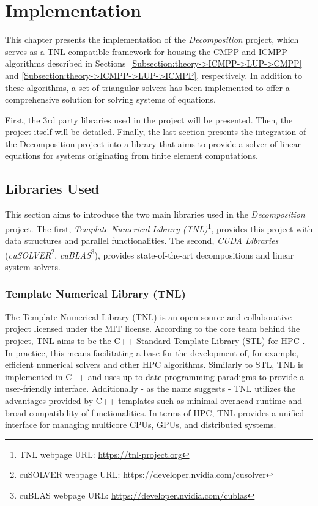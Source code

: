 \chapter{Implementation}\label{Chapter:implementation}
This chapter presents the implementation of the \textit{Decomposition} project, which serves as a TNL-compatible framework for housing the CMPP and ICMPP algorithms described in Sections~\ref{Subsection:theory->ICMPP->LUP->CMPP} and \ref{Subsection:theory->ICMPP->LUP->ICMPP}, respectively. In addition to these algorithms, a set of triangular solvers has been implemented to offer a comprehensive solution for solving systems of equations.

First, the 3rd party libraries used in the project will be presented. Then, the project itself will be detailed. Finally, the last section presents the integration of the Decomposition project into a library that aims to provide a solver of linear equations for systems originating from finite element computations.

\section{Libraries Used}\label{Section:implementation->libraries-used}
This section aims to introduce the two main libraries used in the \textit{Decomposition} project. The first, \textit{Template Numerical Library (TNL)}\footnote{TNL webpage URL: \url{https://tnl-project.org}}, provides this project with data structures and parallel functionalities. The second, \textit{CUDA Libraries} (\textit{cuSOLVER}\footnote{cuSOLVER webpage URL: \url{https://developer.nvidia.com/cusolver}}, \textit{cuBLAS}\footnote{cuBLAS webpage URL: \url{https://developer.nvidia.com/cublas}}), provides state-of-the-art decompositions and linear system solvers.

\subsection{Template Numerical Library (TNL)}\label{Subsection:implementation->libraries-used->TNL}
The Template Numerical Library (TNL) \cite{Oberhuber2021, Klinkovsky2022} is an open-source and collaborative project licensed under the MIT license. According to the core team behind the project, TNL aims to be the C++ Standard Template Library (STL) for HPC \cite{prXEEmGjoxB89XBn}. In practice, this means facilitating a base for the development of, for example, efficient numerical solvers and other HPC algorithms. Similarly to STL, TNL is implemented in C++ and uses up-to-date programming paradigms to provide a user-friendly interface. Additionally - as the name suggests - TNL utilizes the advantages provided by C++ templates such as minimal overhead runtime and broad compatibility of functionalities. In terms of HPC, TNL provides a unified interface for managing multicore CPUs, GPUs, and distributed systems.

